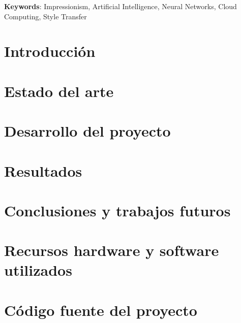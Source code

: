 \documentclass[a4paper]{report}
\newcommand\paginablanco{%
    \null
    \thispagestyle{empty}%
    \newpage}
\begin{document}
\textbf{Keywords}: Impressionism, Artificial Intelligence, Neural Networks, Cloud Computing, Style Transfer

\tableofcontents
\newpage
\listoftables %
\newpage
\listoffigures
\newpage

\paginablanco{}

\chapter{Introducción}

\chapter{Estado del arte}

\chapter{Desarrollo del proyecto}

\chapter{Resultados}

\chapter{Conclusiones y trabajos futuros}

\newpage


\appendix
\clearpage
\addappheadtotoc
\appendixpage

\chapter{Recursos hardware y software utilizados}

\chapter{Código fuente del proyecto} %

\end{document}
